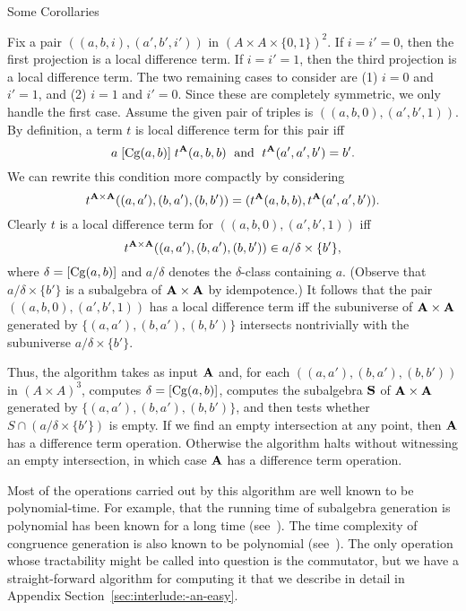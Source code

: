 \documentclass[notes=hide,12pt,xcolor=dvipsnames%
   ]{beamer}
\renewcommand{\cite}[1]{\relax}
\begin{document}
\begin{frame}[label=local-diff-term-cor,shrink=5]{Some Corollaries}
{  Fix a pair
  $((a,b,i), (a',b',i'))$ in $(A\times A \times \{0,1\})^2$. If $i = i' = 0$,
  then the first projection is a local difference term. If $i = i' = 1$,  
    then the third projection is a local difference term. The two remaining cases to
    consider are (1) $i = 0$ and $i'=1$, and (2)
    $i = 1$ and $i'=0$. Since these are completely symmetric, we only handle the
    first case. Assume  the given pair of triples is
    $((a,b,0), (a',b',1))$.  By definition, a term $t$ is local difference term
    for this pair iff
    \[
    a\mathrel{[\operatorname{Cg}(a,b)]} t^{\mathbf{A}}(a,b,b) \; \text{ and } \;
    t^{\mathbf{A}}(a',a',b') = b'.
    \]
    We can rewrite this condition more compactly by
    considering 
    \[t^{\mathbf{A}\times \mathbf{A}}((a,a'), (b,a'), (b,b')) =
    (t^{\mathbf{A}}(a,b,b),t^{\mathbf{A}}(a',a',b')).\]
    Clearly $t$ is a local difference term for
    $((a,b,0), (a',b',1))$ iff
    \[
    t^{\mathbf{A}\times \mathbf{A}}((a,a'), (b,a'), (b,b'))\in a/\delta \times \{b'\},
    \]
    where $\delta = [\operatorname{Cg}(a,b)]$ and $a/\delta$ denotes the
    $\delta$-class containing $a$.
    (Observe that $a/\delta \times \{b'\}$ is a subalgebra of $\mathbf{A} \times \mathbf{A}$
    by idempotence.)
    It follows that the pair
    $((a,b,0), (a',b',1))$ has a local difference term iff
    the subuniverse of $\mathbf{A}\times \mathbf{A}$ generated by
    $\{(a,a'), (b,a'), (b,b')\}$ intersects nontrivially with the subuniverse
    $a/\delta \times \{b'\}$.

    Thus, the algorithm takes as input $\mathbf{A}$ and, for each 
    $((a,a'), (b,a'), (b,b'))$ in $(A\times A)^3$, computes
    $\delta = [\operatorname{Cg}(a,b)]$, computes the subalgebra
    $\mathbf{S}$ of $\mathbf{A}\times \mathbf{A}$ generated by
    $\{(a,a'), (b,a'), (b,b')\}$, and then
    tests whether $S \cap (a/\delta \times \{b'\})$ is empty.
    If we find an empty intersection at any point, then
    $\mathbf{A}$ has a difference term operation.
    Otherwise the algorithm halts without witnessing an empty
    intersection, in which case $\mathbf{A}$ has a difference term operation.

    Most of the operations carried out by this algorithm are well known to be
    polynomial-time.  For example, that the running time of subalgebra generation is
    polynomial has been known for a long time (see~\cite{MR0455543}).
    The time complexity of congruence generation is also known to be polynomial
    (see~\cite{MR2470585}).  The only operation whose tractability might be 
    called into question is the commutator, but we have a straight-forward 
    algorithm for computing it that we describe in detail in 
    Appendix Section~\ref{sec:interlude:-an-easy}.
}
\end{frame}
\end{document}
